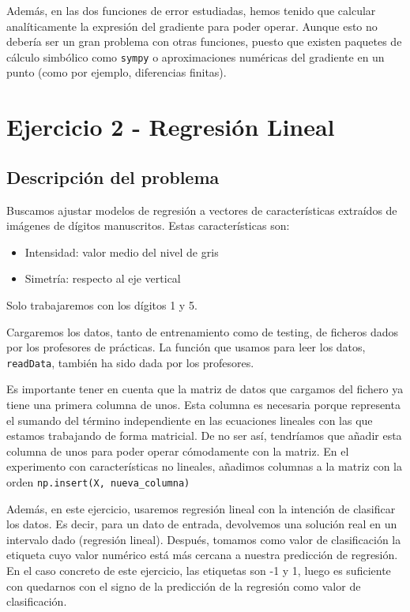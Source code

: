 \documentclass[11pt]{article}
\begin{document}
Además, en las dos funciones de error estudiadas, hemos tenido que calcular analíticamente la expresión del gradiente para poder operar. Aunque esto no debería ser un gran problema con otras funciones, puesto que existen paquetes de cálculo simbólico como \lstinline{sympy} o aproximaciones numéricas del gradiente en un punto (como por ejemplo, diferencias finitas).

\pagebreak

\section{Ejercicio 2 - Regresión Lineal}

\subsection{Descripción del problema}

Buscamos ajustar modelos de regresión a vectores de características extraídos de imágenes de dígitos manuscritos. Estas características son:

\begin{itemize}
    \item Intensidad: valor medio del nivel de gris
    \item Simetría: respecto al eje vertical
\end{itemize}

Solo trabajaremos con los dígitos 1 y 5.

Cargaremos los datos, tanto de entrenamiento como de testing, de ficheros dados por los profesores de prácticas. La función que usamos para leer los datos, \lstinline{readData}, también ha sido dada por los profesores.

Es importante tener en cuenta que la matriz de datos que cargamos del fichero ya tiene una primera columna de unos. Esta columna es necesaria porque representa el sumando del término independiente en las ecuaciones lineales con las que estamos trabajando de forma matricial. De no ser así, tendríamos que añadir esta columna de unos para poder operar cómodamente con la matriz. En el experimento con características no lineales, añadimos columnas a la matriz con la orden \lstinline{np.insert(X, nueva_columna)}

Además, en este ejercicio, usaremos regresión lineal con la intención de clasificar los datos. Es decir, para un dato de entrada, devolvemos una solución real en un intervalo dado (regresión lineal). Después, tomamos como valor de clasificación la etiqueta cuyo valor numérico está más cercana a nuestra predicción de regresión. En el caso concreto de este ejercicio, las etiquetas son -1 y 1, luego es suficiente con quedarnos con el signo de la predicción de la regresión como valor de clasificación.
\end{document}
